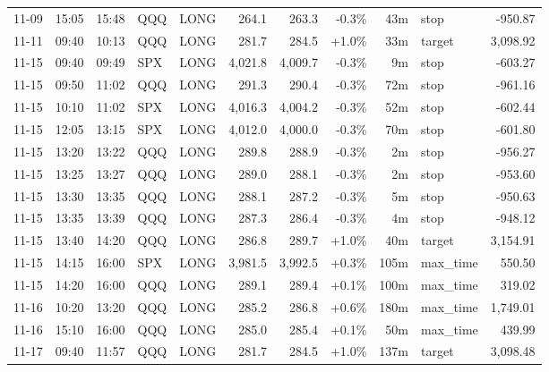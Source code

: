 \documentclass[11pt,a4paper,twoside]{article}
\begin{document}
\begin{center}
\begin{longtable}{>{\color{txtmain}}l l l l l r r r r >{\color{txtmain}}l r}
11-09 & 15:05 & 15:48 & QQQ & LONG & 264.1 & 263.3 & \textcolor{lossred}{-0.3\%} & 43m & stop & \textcolor{lossred}{-950.87} \\
11-11 & 09:40 & 10:13 & QQQ & LONG & 281.7 & 284.5 & \textcolor{wingreen}{+1.0\%} & 33m & target & \textcolor{wingreen}{3,098.92} \\
11-15 & 09:40 & 09:49 & SPX & LONG & 4,021.8 & 4,009.7 & \textcolor{lossred}{-0.3\%} & 9m & stop & \textcolor{lossred}{-603.27} \\
11-15 & 09:50 & 11:02 & QQQ & LONG & 291.3 & 290.4 & \textcolor{lossred}{-0.3\%} & 72m & stop & \textcolor{lossred}{-961.16} \\
11-15 & 10:10 & 11:02 & SPX & LONG & 4,016.3 & 4,004.2 & \textcolor{lossred}{-0.3\%} & 52m & stop & \textcolor{lossred}{-602.44} \\
11-15 & 12:05 & 13:15 & SPX & LONG & 4,012.0 & 4,000.0 & \textcolor{lossred}{-0.3\%} & 70m & stop & \textcolor{lossred}{-601.80} \\
11-15 & 13:20 & 13:22 & QQQ & LONG & 289.8 & 288.9 & \textcolor{lossred}{-0.3\%} & 2m & stop & \textcolor{lossred}{-956.27} \\
11-15 & 13:25 & 13:27 & QQQ & LONG & 289.0 & 288.1 & \textcolor{lossred}{-0.3\%} & 2m & stop & \textcolor{lossred}{-953.60} \\
11-15 & 13:30 & 13:35 & QQQ & LONG & 288.1 & 287.2 & \textcolor{lossred}{-0.3\%} & 5m & stop & \textcolor{lossred}{-950.63} \\
11-15 & 13:35 & 13:39 & QQQ & LONG & 287.3 & 286.4 & \textcolor{lossred}{-0.3\%} & 4m & stop & \textcolor{lossred}{-948.12} \\
11-15 & 13:40 & 14:20 & QQQ & LONG & 286.8 & 289.7 & \textcolor{wingreen}{+1.0\%} & 40m & target & \textcolor{wingreen}{3,154.91} \\
11-15 & 14:15 & 16:00 & SPX & LONG & 3,981.5 & 3,992.5 & \textcolor{wingreen}{+0.3\%} & 105m & max\_time & \textcolor{wingreen}{550.50} \\
11-15 & 14:20 & 16:00 & QQQ & LONG & 289.1 & 289.4 & \textcolor{wingreen}{+0.1\%} & 100m & max\_time & \textcolor{wingreen}{319.02} \\
11-16 & 10:20 & 13:20 & QQQ & LONG & 285.2 & 286.8 & \textcolor{wingreen}{+0.6\%} & 180m & max\_time & \textcolor{wingreen}{1,749.01} \\
11-16 & 15:10 & 16:00 & QQQ & LONG & 285.0 & 285.4 & \textcolor{wingreen}{+0.1\%} & 50m & max\_time & \textcolor{wingreen}{439.99} \\
11-17 & 09:40 & 11:57 & QQQ & LONG & 281.7 & 284.5 & \textcolor{wingreen}{+1.0\%} & 137m & target & \textcolor{wingreen}{3,098.48} \\

\end{longtable}
\end{center}
\end{document}
